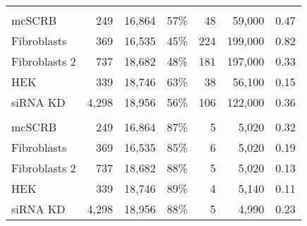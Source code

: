 \begin{tabular}[t]{lrrrrrr}
\addlinespace[3mm]
\multicolumn{7}{l}{\textbf{Downsampling (original)}}\\
\hspace{1em}mcSCRB & 249 & 16,864 & 57\% & 48 & 59,000 & 0.47\\
\hspace{1em}Fibroblasts & 369 & 16,535 & 45\% & 224 & 199,000 & 0.82\\
\hspace{1em}Fibroblasts 2 & 737 & 18,682 & 48\% & 181 & 197,000 & 0.33\\
\hspace{1em}HEK & 339 & 18,746 & 63\% & 38 & 56,100 & 0.15\\
\hspace{1em}siRNA KD & 4,298 & 18,956 & 56\% & 106 & 122,000 & 0.36\\
\addlinespace[3mm]
\multicolumn{7}{l}{\textbf{Downsampling (reduced)}}\\
\hspace{1em}mcSCRB & 249 & 16,864 & 87\% & 5 & 5,020 & 0.32\\
\hspace{1em}Fibroblasts & 369 & 16,535 & 85\% & 6 & 5,020 & 0.19\\
\hspace{1em}Fibroblasts 2 & 737 & 18,682 & 88\% & 5 & 5,020 & 0.13\\
\hspace{1em}HEK & 339 & 18,746 & 89\% & 4 & 5,140 & 0.11\\
\hspace{1em}siRNA KD & 4,298 & 18,956 & 88\% & 5 & 4,990 & 0.23\\
\bottomrule
\end{tabular}
